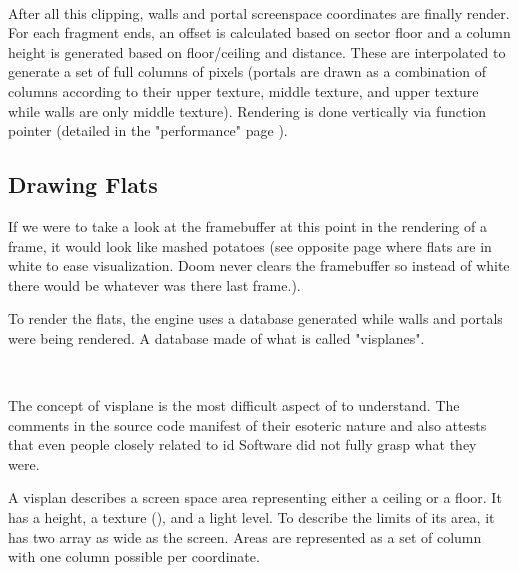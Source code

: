 \\

 \vspace{10mm}















\vspace{-4mm}
After all this clipping, walls and portal screenspace coordinates are finally render. For each fragment ends, an  offset is calculated based on sector floor and a column height is generated based on floor/ceiling and distance. These are interpolated to generate a set of full columns of pixels (portals are drawn as a combination of columns according to their upper texture, middle texture, and upper texture while walls are only middle texture). Rendering is done vertically via  function pointer (detailed in the "performance" page \pageref{performances}).\\

\par
\subsection{Drawing Flats}
 If we were to take a look at the framebuffer at this point in the rendering of a frame, it would look like mashed potatoes (see opposite page where flats are in white to ease visualization. Doom never clears the framebuffer so instead of white there would be whatever was there last frame.).\\
\par
To render the flats, the engine uses a database generated while walls and portals were being rendered. A database made of what is called "visplanes".\\
\par
{}\\
\par
The concept of visplane is the most difficult aspect of \doom{}to understand. The comments in the source code manifest of their esoteric nature and also attests that even people closely related to id Software did not fully grasp what they were.\\
\par
A visplan describes a screen space area representing either a ceiling or a floor. It has a height, a texture (), and a light level. To describe the limits of its area, it has two array as wide as the screen. Areas are represented as a set of column with one column possible per  coordinate.
\par


